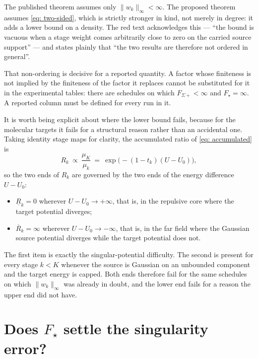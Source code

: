 \documentclass[11pt]{article}
\theoremstyle{plain}
\begin{document}
The published theorem assumes only $\lVert w_k\rVert_\infty<\infty$. The
proposed theorem assumes \eqref{eq: two-sided}, which is strictly stronger in
kind, not merely in degree: it adds a lower bound on a density. The red text
acknowledges this --- ``the bound is vacuous when a stage weight comes
arbitrarily close to zero on the carried source support'' --- and states
plainly that ``the two results are therefore not ordered in general''.

That non-ordering is decisive for a reported quantity. A factor whose
finiteness is not implied by the finiteness of the factor it replaces cannot
be substituted for it in the experimental tables: there are schedules on which
$F_{\Sigma+}<\infty$ and $F_\star=\infty$. A reported column must be defined
for every run in it.

It is worth being explicit about where the lower bound fails, because for the
molecular targets it fails for a structural reason rather than an accidental
one. Taking identity stage maps for clarity, the accumulated ratio of
\eqref{eq: accumulated} is
\begin{equation}
    R_k \ \propto\ \frac{\mu_K}{\mu_k}
    \ =\ \exp\bigl(-(1-t_k)(U-U_0)\bigr),
    \label{eq: R-explicit}
\end{equation}
so the two ends of $R_k$ are governed by the two ends of the energy difference
$U-U_0$:
\begin{itemize}
    \item $\underline R_k=0$ wherever $U-U_0\to+\infty$, that is, in the
    repulsive core where the target potential diverges;
    \item $\overline R_k=\infty$ wherever $U-U_0\to-\infty$, that is, in the
    far field where the Gaussian source potential diverges while the target
    potential does not.
\end{itemize}
The first item is exactly the singular-potential difficulty. The second is
present for every stage $k<K$ whenever the source is Gaussian on an unbounded
component and the target energy is capped. Both ends therefore fail for the
same schedules on which $\lVert w_k\rVert_\infty$ was already in doubt, and the
lower end fails for a reason the upper end did not have.

\section{Does $F_\star$ settle the singularity error?}
\end{document}

